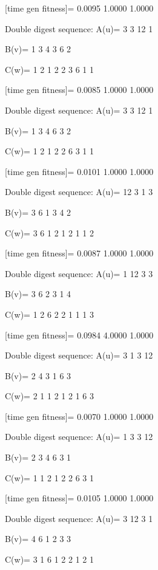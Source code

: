 [time gen fitness]=
    0.0095    1.0000    1.0000

Double digest sequence:
A(u)=
     3     3    12     1

B(v)=
     1     3     4     3     6     2

C(w)=
     1     2     1     2     2     3     6     1     1

[time gen fitness]=
    0.0085    1.0000    1.0000

Double digest sequence:
A(u)=
     3     3    12     1

B(v)=
     1     3     4     6     3     2

C(w)=
     1     2     1     2     2     6     3     1     1

[time gen fitness]=
    0.0101    1.0000    1.0000

Double digest sequence:
A(u)=
    12     3     1     3

B(v)=
     3     6     1     3     4     2

C(w)=
     3     6     1     2     1     2     1     1     2

[time gen fitness]=
    0.0087    1.0000    1.0000

Double digest sequence:
A(u)=
     1    12     3     3

B(v)=
     3     6     2     3     1     4

C(w)=
     1     2     6     2     2     1     1     1     3

[time gen fitness]=
    0.0984    4.0000    1.0000

Double digest sequence:
A(u)=
     3     1     3    12

B(v)=
     2     4     3     1     6     3

C(w)=
     2     1     1     2     1     2     1     6     3

[time gen fitness]=
    0.0070    1.0000    1.0000

Double digest sequence:
A(u)=
     1     3     3    12

B(v)=
     2     3     4     6     3     1

C(w)=
     1     1     2     1     2     2     6     3     1

[time gen fitness]=
    0.0105    1.0000    1.0000

Double digest sequence:
A(u)=
     3    12     3     1

B(v)=
     4     6     1     2     3     3

C(w)=
     3     1     6     1     2     2     1     2     1

